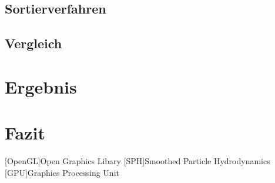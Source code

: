 \documentclass[intern,palatino]{cgBA}
\begin{document}
\subsection{Sortierverfahren}
\subsection{Vergleich}


\section{Ergebnis}


\section{Fazit}


\begin{acronym}
	[OpenGL]{Open Graphics Libary}
	[SPH]{Smoothed Particle Hydrodynamics}
	[GPU]{Graphics Processing Unit}
\end{acronym}


\end{document}
